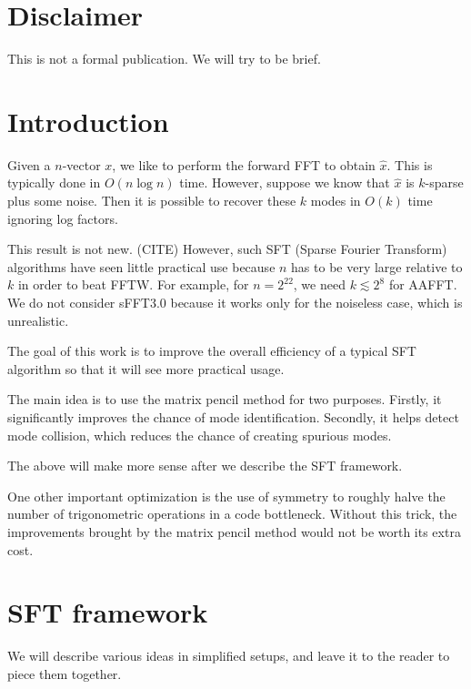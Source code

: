 \documentclass[10pt]{article}
\begin{document}
\pagestyle{plain}
\maketitle

\section*{Disclaimer}
This is not a formal publication. We will try to be brief.

\section{Introduction}
Given a $n$-vector $x$, we like to perform the forward FFT to obtain $\hat{x}$. This is typically done in $O(n \log n)$ time. However, suppose we know that $\hat{x}$ is $k$-sparse plus some noise. Then it is possible to recover these $k$ modes in $O(k)$ time ignoring log factors.

This result is not new. (CITE) However, such SFT (Sparse Fourier Transform) algorithms have seen little practical use because $n$ has to be very large relative to $k$ in order to beat FFTW. For example, for $n=2^{22}$, we need $k\lesssim 2^8$ for AAFFT. We do not consider sFFT3.0 because it works only for the noiseless case, which is unrealistic.

The goal of this work is to improve the overall efficiency of a typical SFT algorithm so that it will see more practical usage.

The main idea is to use the matrix pencil method for two purposes. Firstly, it significantly improves the chance of mode identification. Secondly, it helps detect mode collision, which reduces the chance of creating spurious modes.

The above will make more sense after we describe the SFT framework.

One other important optimization is the use of symmetry to roughly halve the number of trigonometric operations in a code bottleneck. Without this trick, the improvements brought by the matrix pencil method would not be worth its extra cost.

\section{SFT framework}

We will describe various ideas in simplified setups, and leave it to the reader to piece them together.
\end{document}
